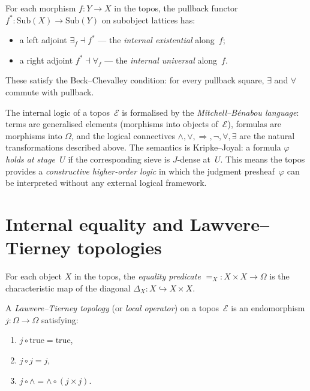 \begin{definition}
\label{def:quantifiers}
For each morphism $f : Y \to X$ in the topos, the pullback functor
$f^* : \mathrm{Sub}(X) \to \mathrm{Sub}(Y)$ on subobject lattices has:
\begin{itemize}[nosep]
\item a left adjoint $\exists_f \dashv f^*$ ---
  the \emph{internal existential} along~$f$;
\item a right adjoint $f^* \dashv \forall_f$ ---
  the \emph{internal universal} along~$f$.
\end{itemize}
These satisfy the Beck--Chevalley condition: for every pullback square,
$\exists$ and $\forall$ commute with pullback.
\end{definition}

\begin{remark}
\label{rem:mitchell-benabou}
The internal logic of a topos~$\mathcal{E}$ is formalised by the
\emph{Mitchell--B\'enabou language}: terms are generalised elements
(morphisms into objects of~$\mathcal{E}$), formulas are morphisms into
$\Omega$, and the logical connectives $\wedge, \vee, \Rightarrow,
\neg, \forall, \exists$ are the natural transformations described
above.  The semantics is Kripke--Joyal: a formula
$\varphi$ \emph{holds at stage~$U$} if the corresponding sieve is
$J$-dense at~$U$.  This means the topos provides a
\emph{constructive higher-order logic} in which the judgment
presheaf~$\varphi$ can be interpreted without any external logical
framework.
\end{remark}

\section{Internal equality and Lawvere--Tierney topologies}

\begin{definition}
For each object $X$ in the topos, the \emph{equality predicate}
$=_X : X \times X \to \Omega$ is the characteristic map of the diagonal
$\Delta_X : X \hookrightarrow X \times X$.
\end{definition}

\begin{definition}
\label{def:lt-topology}
A \emph{Lawvere--Tierney topology} (or \emph{local operator}) on a
topos~$\mathcal{E}$ is an endomorphism $j : \Omega \to \Omega$
satisfying:
\begin{enumerate}[label=(\alph*),nosep]
\item $j \circ \mathrm{true} = \mathrm{true}$,
\item $j \circ j = j$,
\item $j \circ \wedge = \wedge \circ (j \times j)$.
\end{enumerate}
\end{definition}


